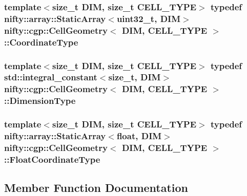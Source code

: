 \subsubsection[{Coordinate\+Type}]{\setlength{\rightskip}{0pt plus 5cm}template$<$size\+\_\+t D\+I\+M, size\+\_\+t C\+E\+L\+L\+\_\+\+T\+Y\+P\+E$>$ typedef {\bf nifty\+::array\+::\+Static\+Array}$<$uint32\+\_\+t, D\+I\+M$>$ {\bf nifty\+::cgp\+::\+Cell\+Geometry}$<$ D\+I\+M, C\+E\+L\+L\+\_\+\+T\+Y\+P\+E $>$\+::{\bf Coordinate\+Type}}\label{classnifty_1_1cgp_1_1CellGeometry_af8ae7d6b7a8f20afae6ce53e88604acf}
\hypertarget{classnifty_1_1cgp_1_1CellGeometry_a8cc75c7033c03864e099a5d907de88d8}{}
\subsubsection[{Dimension\+Type}]{\setlength{\rightskip}{0pt plus 5cm}template$<$size\+\_\+t D\+I\+M, size\+\_\+t C\+E\+L\+L\+\_\+\+T\+Y\+P\+E$>$ typedef std\+::integral\+\_\+constant$<$size\+\_\+t, D\+I\+M$>$ {\bf nifty\+::cgp\+::\+Cell\+Geometry}$<$ D\+I\+M, C\+E\+L\+L\+\_\+\+T\+Y\+P\+E $>$\+::{\bf Dimension\+Type}}\label{classnifty_1_1cgp_1_1CellGeometry_a8cc75c7033c03864e099a5d907de88d8}
\hypertarget{classnifty_1_1cgp_1_1CellGeometry_a07e98f74f6dc5cda1aab1349c7f60d5b}{}
\subsubsection[{Float\+Coordinate\+Type}]{\setlength{\rightskip}{0pt plus 5cm}template$<$size\+\_\+t D\+I\+M, size\+\_\+t C\+E\+L\+L\+\_\+\+T\+Y\+P\+E$>$ typedef {\bf nifty\+::array\+::\+Static\+Array}$<$float, D\+I\+M$>$ {\bf nifty\+::cgp\+::\+Cell\+Geometry}$<$ D\+I\+M, C\+E\+L\+L\+\_\+\+T\+Y\+P\+E $>$\+::{\bf Float\+Coordinate\+Type}}\label{classnifty_1_1cgp_1_1CellGeometry_a07e98f74f6dc5cda1aab1349c7f60d5b}


\subsection{Member Function Documentation}
\hypertarget{classnifty_1_1cgp_1_1CellGeometry_af51fef28bad6333d7604a160e5353188}{}
